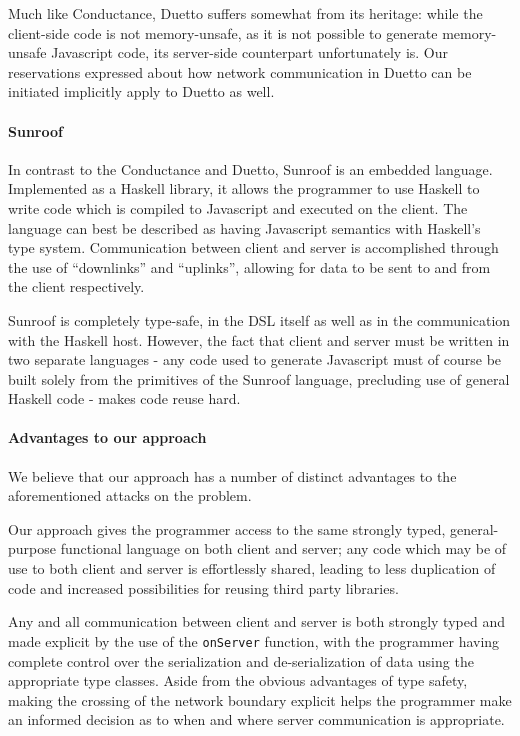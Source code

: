 \documentclass[preprint]{sigplanconf}
\begin{document}
Much like Conductance, Duetto suffers somewhat from its heritage: while the
client-side code is not memory-unsafe, as it is not possible to generate
memory-unsafe Javascript code, its server-side counterpart unfortunately is.
Our reservations expressed about how network communication in Duetto can be
initiated implicitly apply to Duetto as well.

\paragraph{Sunroof} In contrast to the Conductance and Duetto, Sunroof is an
embedded language. Implemented as a Haskell library, it allows the programmer
to use Haskell to write code which is compiled to Javascript and executed on
the client. The language can best be described as having Javascript semantics
with Haskell's type system. Communication between client and server is
accomplished through the use of ``downlinks'' and ``uplinks'', allowing for
data to be sent to and from the client respectively.

Sunroof is completely type-safe, in the DSL itself as well as in the
communication with the Haskell host. However, the fact that client and server
must be written in two separate languages - any code used to generate
Javascript must of course be built solely from the primitives of the Sunroof
language, precluding use of general Haskell code - makes code reuse hard.

\paragraph{Advantages to our approach} We believe that our approach has a
number of distinct advantages to the aforementioned attacks on the problem.

Our approach gives the programmer access to the same strongly typed,
general-purpose functional language on both client and server; any code which
may be of use to both client and server is effortlessly shared, leading to less
duplication of code and increased possibilities for reusing third party
libraries.

Any and all communication between client and server is both strongly typed
and made explicit by the use of the \lstinline!onServer! function, with the
programmer having complete control over the serialization and de-serialization
of data using the appropriate type classes. Aside from the obvious advantages
of type safety, making the crossing of the network boundary explicit helps the
programmer make an informed decision as to when and where server communication
is appropriate.
\end{document}
